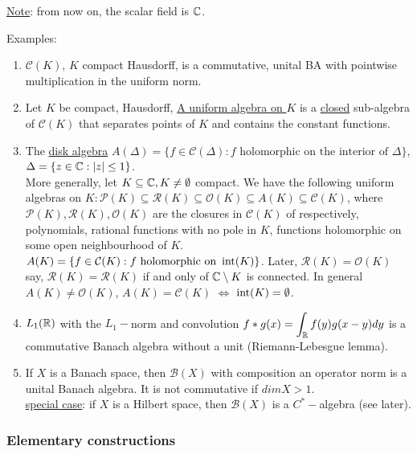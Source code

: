\documentclass{article}
\begin{document}
\noindent\underline{Note}: from now on, the scalar field is $\mathbb{C}$.

\begin{examplesblock}{Examples:}\label{examples: 13}
    \begin{enumerate}
        \item $\mathcal{C}(K)$, $K$ compact Hausdorff, is a commutative, unital BA with pointwise multiplication in the uniform norm.
        \item Let $K$ be compact, Hausdorff, \noindent\underline{A uniform algebra on $K$} is a \noindent\underline{closed} sub-algebra of $\mathcal{C}(K)$ that separates points of $K$ and contains the constant functions.
        \item The \noindent\underline{disk algebra} $A(\Delta)=\{f\in\mathcal{C}(\Delta):f \text{ holomorphic on the interior of } \Delta\}$, $\Delta = \{z\in \mathbb{C}: |z|\leq 1\}$.\\

        More generally, let $K\subseteq \mathbb{C}, K\neq \emptyset$ compact. We have the following uniform algebras on $K:\mathcal{P}(K)\subseteq\mathcal{R}(K)\subseteq \mathcal{O}(K)\subseteq A(K)\subseteq\mathcal{C}(K)$, where $\mathcal{P}(K), \mathcal{R}(K), \mathcal{O}(K)$ are the closures in $\mathcal{C}(K)$ of respectively, polynomials, rational functions with no pole in $K$, functions holomorphic on some open neighbourhood of $K$. $A(K)=\{f\in \mathcal{C}(K):f \text{ holomorphic on } \operatorname{int}(K)\}$. Later, $\mathcal{R}(K)=\mathcal{O}(K)$ say, $\mathcal{R}(K)=\mathcal{R}(K)$ if and only of $\mathbb{C}\setminus K$ is connected. In general $A(K)\neq \mathcal{O}(K)$, $A(K)= \mathcal{C}(K)$ $\iff$ $\operatorname{int}(K)=\emptyset$.
        \item $L_1(\mathbb{R})$ with the $L_1-$norm and convolution $f*g(x)=\displaystyle\int_{\mathbb{R}} f(y)g(x-y)dy$ is a commutative Banach algebra without a unit (Riemann-Lebesgue lemma).
        \item If $X$ is a Banach space, then $\mathcal{B}(X)$ with composition an operator norm is a unital Banach algebra. It is not commutative if $dimX>1$.\\

        \noindent\underline{special case}: if $X$ is a Hilbert space, then $\mathcal{B}(X)$ is a $C^*-$algebra (see later).
    \end{enumerate}
\end{examplesblock}

\subsubsection{Elementary constructions}
\end{document}
